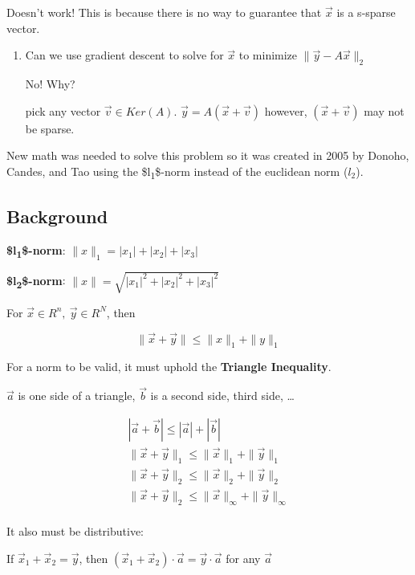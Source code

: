 \documentclass[11pt]{article}
\begin{document}
Doesn't work! This is because there is no way to guarantee that \(\vec x\) is a
s-sparse vector.

\begin{enumerate}
\item Can we use gradient descent to solve for \(\vec x\) to minimize \(\| \vec y - A \vec x \|_2\)

No! Why?

pick any vector \(\vec v \in Ker(A)\). \(\vec y = A (\vec x + \vec v)\) however,
\((\vec x + \vec v)\) may not be sparse.
\end{enumerate}


New math was needed to solve this problem so it was created in 2005 by Donoho,
Candes, and Tao using the \$l\textsubscript{1}\$-norm instead of the euclidean norm (\(l_2\)).

\subsection{Background}
\label{sec:org2022096}

\textbf{\$l\textsubscript{1}\$-norm}: \(\|x\|_1 = |x_1| + |x_2| + |x_3|\)

\textbf{\$l\textsubscript{2}\$-norm}: \(\|x\| = \sqrt{|x_1|^2 + |x_2|^2 + |x_3|^2}\)

For \(\vec x \in R^n, \ \vec y \in R^N\), then

$$
\| \vec x + \vec y \| \leq \| x \|_1 + \| y \|_1
$$

For a norm to be valid, it must uphold the \textbf{Triangle Inequality}.

\(\vec a\) is one side of a triangle, \(\vec b\) is a second side, third side, \ldots{}

\begin{equation}
\begin{split}
|\vec a + \vec b | \leq |\vec{a}| + |\vec{b}|\\
\| \vec{x} + \vec{y} \|_1 \leq \|\vec{x}\|_1 + \|\vec{y}\|_1\\
\| \vec{x} + \vec{y} \|_2 \leq \|\vec{x}\|_2 + \|\vec{y}\|_2\\
\| \vec{x} + \vec{y} \|_2 \leq \|\vec{x}\|_\infty + \|\vec{y}\|_\infty\\
\end{split}
\end{equation}


It also must be distributive:

If \(\vec x_1 + \vec x_2 = \vec y\), then \((\vec x_1 + \vec x_2) \cdot \vec a =
\vec{y} \cdot \vec{a}\) for any \(\vec a\)
\end{document}
